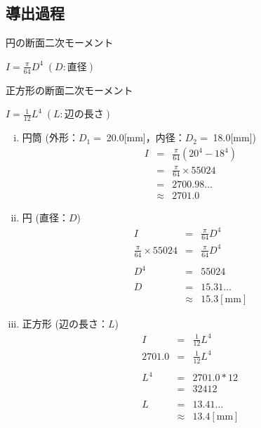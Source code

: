 \documentclass[twocolumn,a4j]{jsarticle}
\begin{document}
\subsection{導出過程}
    \begin{itembox}[l]{円の断面二次モーメント}
        \begin{center}
            $\displaystyle I = \frac{\pi}{64}D^4\;\left(D:直径\right)$
        \end{center}
    \end{itembox}
    \begin{itembox}[l]{正方形の断面二次モーメント}
        \begin{center}
            $\displaystyle I = \frac{1}{12}L^4\;\left(L:辺の長さ\right)$
        \end{center}
    \end{itembox}
    \par
    \begin{enumerate}[(i)]
        \item 円筒 (外形：$D_1=\;$20.0[mm]，内径：$D_2=\;$18.0[mm])
        \begin{eqnarray*}
            I &=& \frac{\pi}{64} \left(20^4 - 18^4\right)\\
            &=& \frac{\pi}{64} × 55024\\
            &=& 2700.98 \dots\\
            &\approx& 2701.0
        \end{eqnarray*}
        \item 円 (直径：$D$)
        \begin{eqnarray*}
            I &=& \frac{\pi}{64}D^4\\
            \frac{\pi}{64} × 55024 &=& \frac{\pi}{64}D^4\\
            \\
            D^4 &=& 55024\\
            \\
            D&=& 15.31\dots\\
            &\approx& 15.3 \left[\mathrm{mm}\right]
        \end{eqnarray*}
        \item 正方形 (辺の長さ：$L$)
        \begin{eqnarray*}
            I &=& \frac{1}{12}L^4\\
            2701.0 &=& \frac{1}{12}L^4\\
            \\
            L^4 &=& 2701.0 * 12\\
            &=& 32412\\
            \\
            L&=& 13.41\dots\\
            &\approx& 13.4 \left[\mathrm{mm}\right]
        \end{eqnarray*}
    \end{enumerate}
\end{document}
